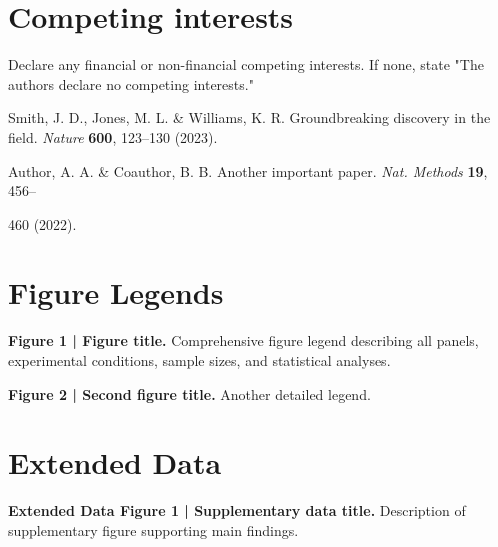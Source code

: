 \documentclass[12pt]{article}
\begin{document}
\section*{Competing interests}
Declare any financial or non-financial competing interests. If none, state "The authors declare no competing interests."


\begin{thebibliography}{99}

Smith, J. D., Jones, M. L. \& Williams, K. R. Groundbreaking discovery in the field. \textit{Nature} \textbf{600}, 123--130 (2023).

Author, A. A. \& Coauthor, B. B. Another important paper. \textit{Nat. Methods} \textbf{19}, 456--

460 (2022).


\end{thebibliography}

\section*{Figure Legends}

\textbf{Figure 1 | Figure title.} Comprehensive figure legend describing all panels, experimental conditions, sample sizes, and statistical analyses.

\textbf{Figure 2 | Second figure title.} Another detailed legend.

\section*{Extended Data}

\textbf{Extended Data Figure 1 | Supplementary data title.} Description of supplementary figure supporting main findings.
\end{document}
